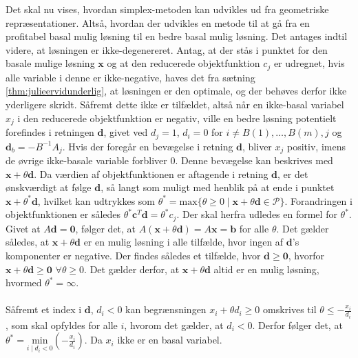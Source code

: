 \noindent
%
%
Det skal nu vises, hvordan simplex-metoden kan udvikles ud fra geometriske repræsentationer.
Altså, hvordan der udvikles en metode til at gå fra en profitabel basal mulig løsning til en bedre basal mulig løsning.
Det antages indtil videre, at løsningen er ikke-degenereret.
Antag, at der stås i punktet for den basale mulige løsning $\mathbf{x}$ og at den reducerede objektfunktion $c_j$ er udregnet, hvis alle variable i denne er ikke-negative, haves det fra sætning \ref{thm:julieervidunderlig}, at løsningen er den optimale, og der behøves derfor ikke yderligere skridt.
Såfremt dette ikke er tilfældet, altså når en ikke-basal variabel $x_j$ i den reducerede objektfunktion er negativ, ville en bedre løsning potentielt forefindes i retningen $\mathbf{d}$, givet ved  $d_j=1$, $d_i=0$ for $i \neq B(1),\ldots,B(m),j$ og $\mathbf{d}_b=-B^{-1}A_j$.
Hvis der foregår en bevægelse i retning $\mathbf{d}$, bliver $x_j$ positiv, imens de øvrige ikke-basale variable forbliver $0$.
Denne bevægelse kan beskrives med $\mathbf{x}+\theta \mathbf{d}$. 
Da værdien af objektfunktionen er aftagende i retning $\mathbf{d}$, er det ønskværdigt at følge $\mathbf{d}$, så langt som muligt med henblik på at ende i punktet $\mathbf{x}+\theta^{*} \mathbf{d}$, hvilket kan udtrykkes som 
$\theta^{*}=\text{max} \{ \theta \geq 0 \mid \mathbf{x}+\theta \mathbf{d} \in \mathcal{P} \}$.
Forandringen i objektfunktionen er således $\theta^{*}\mathbf{c}^T \mathbf{d}=\theta^{*}c_j$.
Der skal herfra udledes en formel for $\theta^{*}$.
Givet at $A\mathbf{d}=\mathbf{0}$, følger det, at $A(\mathbf{x}+\theta \mathbf{d})=A\mathbf{x}=\mathbf{b}$ for alle $\theta$.
Det gælder således, at $\mathbf{x}+\theta\mathbf{d}$ er en mulig løsning i alle tilfælde, hvor ingen af $\mathbf{d}$'s komponenter er negative.
Der findes således et tilfælde, hvor $\mathbf{d} \geq \mathbf{0}$, hvorfor $\mathbf{x} + \theta \mathbf{d} \geq \mathbf{0}$  $\forall\theta \geq 0$. 
Det gælder derfor, at $\mathbf{x} + \theta \mathbf{d} $ altid er en mulig løsning, hvormed $\theta^*=\infty$. \\\\
Såfremt et index i $\mathbf{d}$, $d_i<0$ kan begrænsningen $x_i + \theta d_i \geq 0$ omskrives til $\theta \leq -\frac{x_i}{d_i}$, som skal opfyldes for alle $i$, hvorom det gælder, at $d_i<0$.
Derfor følger det, at $\theta^*= \underset{i \mid d_i<0}{\text{min}}(-\frac{x_i}{d_i})$.
Da $x_i$ ikke er en basal variabel.
